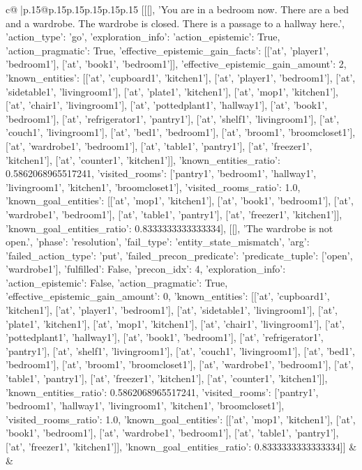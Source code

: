 \documentclass{article}
\begin{document}
{\begin{supertabular}{c@{$\;$}|p{.15\linewidth}@{}p{.15\linewidth}p{.15\linewidth}p{.15\linewidth}p{.15\linewidth}p{.15\linewidth}}
{{{	 [[[], 'You are in a bedroom now. There are a bed and a wardrobe. The wardrobe is closed. There is a passage to a hallway here.', {'action_type': 'go', 'exploration_info': {'action_epistemic': True, 'action_pragmatic': True, 'effective_epistemic_gain_facts': [['at', 'player1', 'bedroom1'], ['at', 'book1', 'bedroom1']], 'effective_epistemic_gain_amount': 2, 'known_entities': [['at', 'cupboard1', 'kitchen1'], ['at', 'player1', 'bedroom1'], ['at', 'sidetable1', 'livingroom1'], ['at', 'plate1', 'kitchen1'], ['at', 'mop1', 'kitchen1'], ['at', 'chair1', 'livingroom1'], ['at', 'pottedplant1', 'hallway1'], ['at', 'book1', 'bedroom1'], ['at', 'refrigerator1', 'pantry1'], ['at', 'shelf1', 'livingroom1'], ['at', 'couch1', 'livingroom1'], ['at', 'bed1', 'bedroom1'], ['at', 'broom1', 'broomcloset1'], ['at', 'wardrobe1', 'bedroom1'], ['at', 'table1', 'pantry1'], ['at', 'freezer1', 'kitchen1'], ['at', 'counter1', 'kitchen1']], 'known_entities_ratio': 0.5862068965517241, 'visited_rooms': ['pantry1', 'bedroom1', 'hallway1', 'livingroom1', 'kitchen1', 'broomcloset1'], 'visited_rooms_ratio': 1.0, 'known_goal_entities': [['at', 'mop1', 'kitchen1'], ['at', 'book1', 'bedroom1'], ['at', 'wardrobe1', 'bedroom1'], ['at', 'table1', 'pantry1'], ['at', 'freezer1', 'kitchen1']], 'known_goal_entities_ratio': 0.8333333333333334}}], [[], 'The wardrobe is not open.', {'phase': 'resolution', 'fail_type': 'entity_state_mismatch', 'arg': {'failed_action_type': 'put', 'failed_precon_predicate': {'predicate_tuple': ['open', 'wardrobe1'], 'fulfilled': False, 'precon_idx': 4}}, 'exploration_info': {'action_epistemic': False, 'action_pragmatic': True, 'effective_epistemic_gain_amount': 0, 'known_entities': [['at', 'cupboard1', 'kitchen1'], ['at', 'player1', 'bedroom1'], ['at', 'sidetable1', 'livingroom1'], ['at', 'plate1', 'kitchen1'], ['at', 'mop1', 'kitchen1'], ['at', 'chair1', 'livingroom1'], ['at', 'pottedplant1', 'hallway1'], ['at', 'book1', 'bedroom1'], ['at', 'refrigerator1', 'pantry1'], ['at', 'shelf1', 'livingroom1'], ['at', 'couch1', 'livingroom1'], ['at', 'bed1', 'bedroom1'], ['at', 'broom1', 'broomcloset1'], ['at', 'wardrobe1', 'bedroom1'], ['at', 'table1', 'pantry1'], ['at', 'freezer1', 'kitchen1'], ['at', 'counter1', 'kitchen1']], 'known_entities_ratio': 0.5862068965517241, 'visited_rooms': ['pantry1', 'bedroom1', 'hallway1', 'livingroom1', 'kitchen1', 'broomcloset1'], 'visited_rooms_ratio': 1.0, 'known_goal_entities': [['at', 'mop1', 'kitchen1'], ['at', 'book1', 'bedroom1'], ['at', 'wardrobe1', 'bedroom1'], ['at', 'table1', 'pantry1'], ['at', 'freezer1', 'kitchen1']], 'known_goal_entities_ratio': 0.8333333333333334}}]] 
	  } 
	   } 
	   } 
	 & & \\ 
 


\end{supertabular}}
\end{document}
